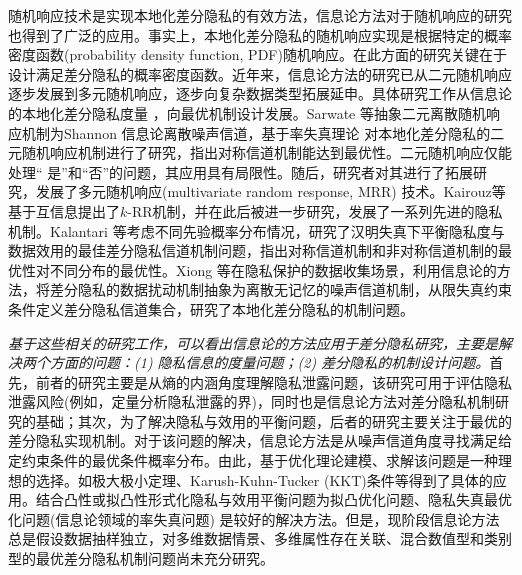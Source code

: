 随机响应技术是实现本地化差分隐私的有效方法，信息论方法对于随机响应的研究也得到了广泛的应用。事实上，本地化差分隐私的随机响应实现是根据特定的概率密度函数(probability density function, PDF)随机响应。在此方面的研究关键在于设计满足差分隐私的概率密度函数。近年来，信息论方法的研究已从二元随机响应逐步发展到多元随机响应，逐步向复杂数据类型拓展延申。具体研究工作从信息论的本地化差分隐私度量
\cite{lopuhaa-zwakenberg2019information}，向最优机制设计发展。Sarwate 等\cite{sarwate2014a}抽象二元离散随机响应机制为Shannon 信息论\cite{shannon1948a}离散噪声信道，基于率失真理论\cite{cover2006elements} 对本地化差分隐私的二元随机响应机制进行了研究，指出对称信道机制能达到最优性。二元随机响应仅能处理`` 是''和``否''的问题，其应用具有局限性。随后，研究者对其进行了拓展研究，发展了多元随机响应(multivariate random response, MRR) 技术。Kairouz等\cite{kairouz2016extremal} 基于互信息提出了$k$-RR机制，并在此后被进一步研究，发展了一系列先进的隐私机制。Kalantari 等\cite{kalantari2018robust}考虑不同先验概率分布情况，研究了汉明失真下平衡隐私度与数据效用的最佳差分隐私信道机制问题，指出对称信道机制和非对称信道机制的最优性对不同分布的最优性。Xiong 等\cite{xiong2016randomized}在隐私保护的数据收集场景，利用信息论的方法，将差分隐私的数据扰动机制抽象为离散无记忆的噪声信道机制，从限失真约束条件定义差分隐私信道集合，研究了本地化差分隐私的机制问题。

{\em 基于这些相关的研究工作，可以看出信息论的方法应用于差分隐私研究，主要是解决两个方面的问题：(1) 隐私信息的度量问题；(2) 差分隐私的机制设计问题。}首先，前者的研究主要是从熵的内涵角度理解隐私泄露问题，该研究可用于评估隐私泄露风险(例如，定量分析隐私泄露的界)，同时也是信息论方法对差分隐私机制研究的基础；其次，为了解决隐私与效用的平衡问题，后者的研究主要关注于最优的差分隐私实现机制。对于该问题的解决，信息论方法是从噪声信道角度寻找满足给定约束条件的最优条件概率分布。由此，基于优化理论建模\cite{iyengar2019towards}、求解该问题是一种理想的选择。如极大极小定理、Karush-Kuhn-Tucker (KKT)条件等\cite{boyd2004convex}得到了具体的应用。结合凸性或拟凸性形式化隐私与效用平衡问题为拟凸优化问题\cite{xiong2016randomized}、隐私失真最优化问题\cite{wang2016on}(信息论领域的率失真问题)
是较好的解决方法。但是，现阶段信息论方法总是假设数据抽样独立，对多维数据情景、多维属性存在关联、混合数值型和类别型的最优差分隐私机制问题尚未充分研究。


